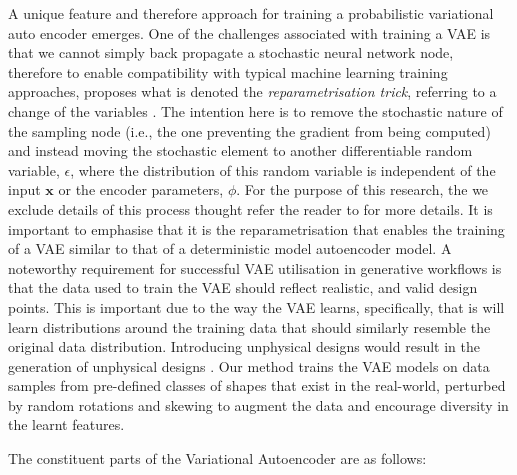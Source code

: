 \documentclass{article}
\begin{document}
A unique feature and therefore approach for training a probabilistic variational auto encoder emerges. One of the challenges associated with training a VAE is that we cannot simply back propagate a stochastic neural network node, therefore to enable compatibility with typical machine learning training approaches, \cite{Kingma2013} proposes what is denoted the \textit{reparametrisation trick}, referring to a change of the variables \citep{Kingma2019}. The intention here is to remove the stochastic nature of the sampling node (i.e., the one preventing the gradient from being computed) and instead moving the stochastic element to another differentiable random variable, $\epsilon$, where the distribution of this random variable is independent of the input $\textbf{x}$ or the encoder parameters, $\phi$. For the purpose of this research, the we exclude details of this process thought refer the reader to \cite{Kingma2013} for more details. It is important to emphasise that it is the reparametrisation that enables the training of a VAE similar to that of a deterministic model autoencoder model. A noteworthy requirement for successful VAE utilisation in generative workflows is that the data used to train the VAE should reflect realistic, and valid design points. This is important due to the way the VAE learns, specifically, that is will learn distributions around the training data that should similarly resemble the original data distribution. Introducing unphysical designs would result in the generation of unphysical designs \citep{Huang2022}. Our method trains the VAE models on data samples from pre-defined classes of shapes that exist in the real-world, perturbed by random rotations and skewing to augment the data and encourage diversity in the learnt features.

The constituent parts of the Variational Autoencoder are as follows:
\end{document}
